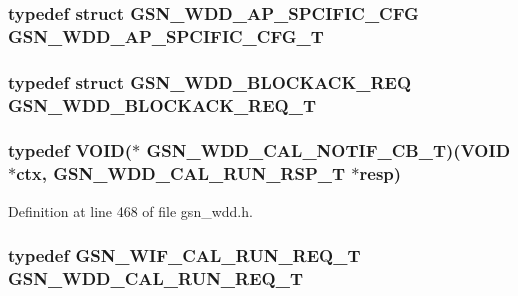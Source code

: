 \hypertarget{a00603_a1b8ae0d5ebc50c0a8704758bf4a472cd}{
\subsubsection[{GSN\_\-WDD\_\-AP\_\-SPCIFIC\_\-CFG\_\-T}]{\setlength{\rightskip}{0pt plus 5cm}typedef struct {\bf GSN\_\-WDD\_\-AP\_\-SPCIFIC\_\-CFG} {\bf GSN\_\-WDD\_\-AP\_\-SPCIFIC\_\-CFG\_\-T}}}
\label{a00603_a1b8ae0d5ebc50c0a8704758bf4a472cd}
\hypertarget{a00603_ab7d53da5c96f5f0ec1b31894fdc02777}{
\subsubsection[{GSN\_\-WDD\_\-BLOCKACK\_\-REQ\_\-T}]{\setlength{\rightskip}{0pt plus 5cm}typedef struct {\bf GSN\_\-WDD\_\-BLOCKACK\_\-REQ}  {\bf GSN\_\-WDD\_\-BLOCKACK\_\-REQ\_\-T}}}
\label{a00603_ab7d53da5c96f5f0ec1b31894fdc02777}
\hypertarget{a00603_a1dbcda6416e95d84f0c8f8f8dcad8a18}{
\subsubsection[{GSN\_\-WDD\_\-CAL\_\-NOTIF\_\-CB\_\-T}]{\setlength{\rightskip}{0pt plus 5cm}typedef VOID($\ast$ {\bf GSN\_\-WDD\_\-CAL\_\-NOTIF\_\-CB\_\-T})(VOID $\ast$ctx, {\bf GSN\_\-WDD\_\-CAL\_\-RUN\_\-RSP\_\-T} $\ast$resp)}}
\label{a00603_a1dbcda6416e95d84f0c8f8f8dcad8a18}


Definition at line 468 of file gsn\_\-wdd.h.

\hypertarget{a00603_a02ee63c44fe251b49941f6fc917aa922}{
\subsubsection[{GSN\_\-WDD\_\-CAL\_\-RUN\_\-REQ\_\-T}]{\setlength{\rightskip}{0pt plus 5cm}typedef {\bf GSN\_\-WIF\_\-CAL\_\-RUN\_\-REQ\_\-T} {\bf GSN\_\-WDD\_\-CAL\_\-RUN\_\-REQ\_\-T}}}
\label{a00603_a02ee63c44fe251b49941f6fc917aa922}


